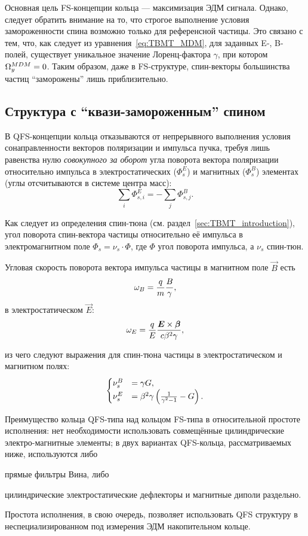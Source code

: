 Основная цель FS-концепции кольца --- максимизация ЭДМ сигнала. Однако, следует обратить внимание на то, что строгое выполнение условия замороженности спина возможно только для референсной частицы. Это связано с тем, что, как следует из уравнения~\eqref{eq:TBMT_MDM}, для заданных E-, B-полей, существует уникальное значение Лоренц-фактора $\gamma$, при котором $\Omega_y^{MDM} = 0$. Таким образом, даже в FS-структуре, спин-векторы большинства частиц ``заморожены'' лишь приблизительно.

\subsection{Структура с ``квази-замороженным'' спином} \label{chpt2:concept:QFS}
В QFS-концепции кольца отказываются от непрерывного выполнения условия сонаправленности векторов поляризации и импульса пучка, требуя лишь равенства нулю \emph{совокупного за оборот} угла поворота вектора поляризации относительно импульса в электростатических ($\Phi_s^E$) и магнитных ($\Phi_s^B$) элементах (углы отсчитываются в системе центра масс):~\cite{Senichev:Lattices}
\begin{equation*}
	\sum_i \Phi_{s,i}^E = -\sum_j \Phi_{s,j}^B.
\end{equation*}

Как следует из определения спин-тюна (см. раздел~\ref{sec:TBMT_introduction}), угол поворота спин-вектора частицы относительно её импульса в электромагнитном поле $\Phi_s = \nu_s \cdot \Phi$, где $\Phi$ угол поворота импульса, а $\nu_s$ спин-тюн.

Угловая скорость поворота вектора импульса частицы в магнитном поле $\vec B$ есть 
\[
\omega_B = \frac qm \frac B \gamma,
\]
в электростатическом $\vec E$:
\[
\omega_E = \frac qE \frac{\boldsymbol E\times \boldsymbol\beta}{c\beta^2\gamma},
\]

из чего следуют выражения для спин-тюна частицы в электростатическом и магнитном полях:
\begin{equation}
	\begin{cases}
		\nu_s^B &= \gamma G, \\
		\nu_s^E &= \beta^2\gamma\bkt{\frac{1}{\gamma^2-1} - G}.
	\end{cases}
\end{equation}

Преимущество кольца QFS-типа над кольцом FS-типа в относительной простоте исполнения: нет необходимости использовать совмещённые цилиндрические электро-магнитные элементы; в двух вариантах QFS-кольца, рассматриваемых ниже, используются либо
\begin{enumerate*}
\item прямые фильтры Вина, либо
\item цилиндрические электростатические дефлекторы и магнитные диполи раздельно.
\end{enumerate*}
Простота исполнения, в свою очередь, позволяет использовать QFS структуру в неспециализированном под
измерения ЭДМ накопительном кольце.

